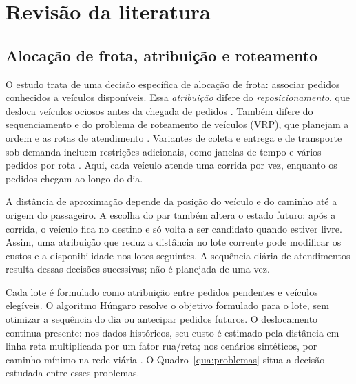 \section{Revisão da literatura}

\subsection{Alocação de frota, atribuição e roteamento}

O estudo trata de uma decisão específica de alocação de frota: associar pedidos conhecidos a veículos disponíveis. Essa \textit{atribuição} difere do \textit{reposicionamento}, que desloca veículos ociosos antes da chegada de pedidos \cite{pavone2012, pouls2025}. Também difere do sequenciamento e do problema de roteamento de veículos (VRP), que planejam a ordem e as rotas de atendimento \cite{toth2002}. Variantes de coleta e entrega e de transporte sob demanda incluem restrições adicionais, como janelas de tempo e vários pedidos por rota \cite{cordeau2007, berbeglia2010}. Aqui, cada veículo atende uma corrida por vez, enquanto os pedidos chegam ao longo do dia.

A distância de aproximação depende da posição do veículo e do caminho até a origem do passageiro. A escolha do par também altera o estado futuro: após a corrida, o veículo fica no destino e só volta a ser candidato quando estiver livre. Assim, uma atribuição que reduz a distância no lote corrente pode modificar os custos e a disponibilidade nos lotes seguintes. A sequência diária de atendimentos resulta dessas decisões sucessivas; não é planejada de uma vez.

Cada lote é formulado como atribuição entre pedidos pendentes e veículos elegíveis. O algoritmo Húngaro resolve o objetivo formulado para o lote, sem otimizar a sequência do dia ou antecipar pedidos futuros. O deslocamento continua presente: nos dados históricos, seu custo é estimado pela distância em linha reta multiplicada por um fator rua/reta; nos cenários sintéticos, por caminho mínimo na rede viária \cite{dijkstra1959}. O Quadro~\ref{qua:problemas} situa a decisão estudada entre esses problemas.

